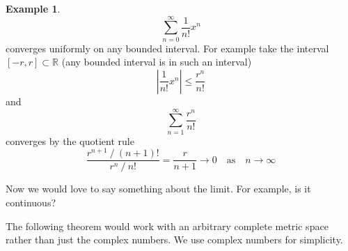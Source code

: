 \documentclass[12pt]{book}
\newcommand{\abs}[1]{\left\lvert {#1} \right\rvert}
\newcommand{\R}{{\mathbb{R}}}
\theoremstyle{plain}
\theoremstyle{remark}
\theoremstyle{definition}
\theoremstyle{exercise}
\theoremstyle{example}
\newtheorem{example}[thm]{Example}
\begin{document}
\begin{example}
\begin{equation*}
\sum_{n=0}^\infty \frac{1}{n!} x^n
\end{equation*}
converges uniformly on any bounded interval.  For
example take the interval $[-r,r] \subset \R$  (any bounded interval
is in such an interval)
\begin{equation*}
\abs{\frac{1}{n!} x^n} \leq 
\frac{r^n}{n!}
\end{equation*}
and
\begin{equation*}
\sum_{n=1}^\infty \frac{r^n}{n!}
\end{equation*}
converges by the quotient rule
\begin{equation*}
\frac{r^{n+1} ~ / ~ (n+1)!}{r^{n} ~ / ~ n!}
=
\frac{r}{n+1}
\to 0
\quad \text{as} \quad n \to \infty
\end{equation*}
\end{example}

Now we would love to say something about the limit.  For example, is it
continuous?

%
%
%
%
%

\medskip

The following theorem would work with an arbitrary complete metric space
rather than just the complex numbers.  We use complex numbers for
simplicity.

\medskip
\end{document}
